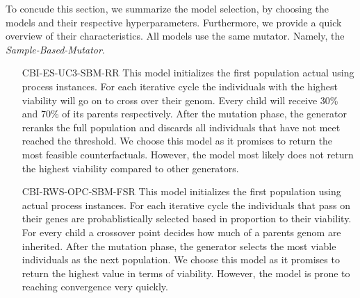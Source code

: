 \documentclass[./../../paper.tex]{subfiles}
\begin{document}
To concude this section, we summarize the model selection, by choosing the models and their respective hyperparameters. Furthermore, we provide a quick overview of their characteristics. All models use the same mutator. Namely, the \emph{Sample-Based-Mutator}. 


\begin{enumerate}
    \item[CBI-ES-UC3-SBM-RR] This model initializes the first population actual using process instances. For each iterative cycle the individuals with the highest viability will go on to cross over their genom. Every child will receive 30\% and 70\% of its parents respectively. After the mutation phase, the generator reranks the full population and discards all individuals that have not meet reached the threshold. We choose this model as it promises to return the most feasible counterfactuals. However, the model most likely does not return the highest viability compared to other generators.
    \item[CBI-RWS-OPC-SBM-FSR] This model initializes the first population using actual process instances. For each iterative cycle the individuals that pass on their genes are probablistically selected based in proportion to their viability. For every child a crossover point decides how much of a parents genom are inherited. After the mutation phase, the generator selects the most viable individuals as the next population. We choose this model as it promises to return the highest value in terms of viability. However, the model is prone to reaching convergence very quickly.  
\end{enumerate}

\end{document}
